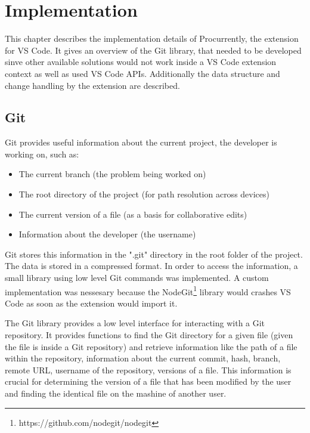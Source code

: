 \chapter{Implementation}



This chapter describes the implementation details of Procurrently, the extension for VS Code. It gives an overview of the Git library, that needed to be developed sinve other available solutions would not work inside a VS Code extension context as well as used VS Code APIs. Additionally the data structure and change handling by the extension are described.

\section{Git}

Git provides useful information about the current project, the developer is working on, such as:
\begin{itemize}
    \item The current branch (the problem being worked on)
    \item The root directory of the project (for path resolution across devices)
    \item The current version of a file (as a basis for collaborative edits)
    \item Information about the developer (the username)
\end{itemize}

Git stores this information in the ".git" directory in the root folder of the project.
The data is stored in a compressed format. In order to access the information, a small library using low level Git commands was implemented. 
A custom implementation was nessesary because the NodeGit\footnote{https://github.com/nodegit/nodegit} library would crashes VS Code as soon as the extension would import it.

The Git library provides a low level interface for interacting with a Git repository. It provides functions to find the Git directory for a given file (given the file is inside a Git repository) and retrieve information like the path of a file within the repository, information about the current commit, hash, branch, remote URL, username of the repository, versions of a file. This information is crucial for determining the version of a file that has been modified by the user and finding the identical file on the mashine of another user.

